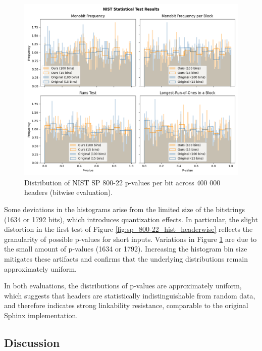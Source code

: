 \begin{figure}[H]
    \centering
    \includegraphics[width=0.9\linewidth]{Images/25-05-19-bitwise_comparison_400000h-20n-3m-3p5.png}
    \caption{Distribution of NIST SP 800-22 p-values per bit across 400 000 headers (bitwise evaluation).}
    \label{fig:sp_800-22_hist_bitwise}
\end{figure}

Some deviations in the histograms arise from the limited size of the bitstrings (1634 or 1792 bits), which introduces quantization effects. 
In particular, the slight distortion in the first test of Figure \ref{fig:sp_800-22_hist_headerwise} reflects the granularity of possible p-values for short inputs. 
Variations in Figure \ref{fig:sp_800-22_hist_bitwise} are due to the small amount of p-values (1634 or 1792).
Increasing the histogram bin size mitigates these artifacts and confirms that the underlying distributions remain approximately uniform.

In both evaluations, the distributions of p-values are approximately uniform, which suggests that headers are statistically indistinguishable from random data, 
and therefore indicates strong linkability resistance, comparable to the original Sphinx implementation.

\subsection{Discussion}

